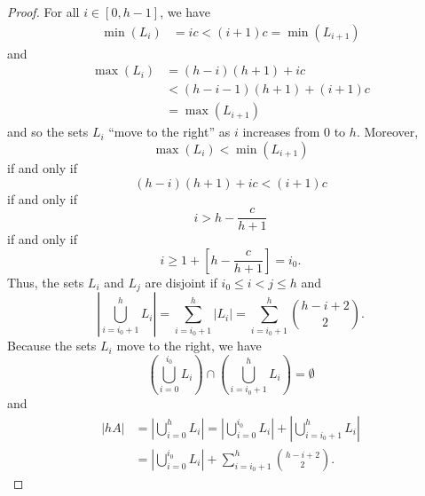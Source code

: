\documentclass{amsart}
\begin{document}
\begin{proof}
For all $i \in [0,h-1]$, we have 
\begin{align*} 
\min\left(L_i\right)  & =  ic  <  (i+1)c  = \min\left( L_{i+1} \right)  
\end{align*} 
and 
\begin{align*} 
\max\left(L_i \right) & = (h-i)(h+1) + ic  \\
& < (h-i-1)(h+1) + (i+1)c \\
& = \max\left( L_{i+1} \right)  
\end{align*} 
and so the sets $L_i$ ``move to  the right'' as $i$ increases 
from 0 to $h$. 
Moreover, 
\[
\max\left( L_i \right) <  \min\left(L_{i+1} \right)  
\]
if and only if 
\[
 (h-i)(h+1)  + ic <  (i+1)c
\]
if and only if 
\[
i > h - \frac{c}{h+1} 
\]
if and only if 
\[
i \geq 1 + \left[  h - \frac{c}{h+1} \right] = i_0.  
\]
Thus, the sets $ L_i$ and $L_j$ are disjoint if $i_0 \leq i < j \leq h$ 
and 
\[
\left| \bigcup_{i=i_0+1}^h L_i \right| = \sum_{i=i_0+1}^h  \left|  L_i \right| 
= \sum_{i=i_0+1}^h  \binom{h-i+2}{2}. 
\]
Because the sets $L_i$ move to the right, we have 
\[
\left( \bigcup_{i=0}^{i_0} L_i  \right) \cap \left( \bigcup_{i=i_0+1}^h L_i \right) = \emptyset    
\] 
and 
\begin{align}                   \label{h-adic:PartialSum}
|hA| & = \left| \bigcup_{i=0}^h L_i \right| 
= \left|  \bigcup_{i=0}^{i_0} L_i \right| + \left|  \bigcup_{i=i_0+1}^{h} L_i \right|  
\nonumber  \\
& = \left|  \bigcup_{i=0}^{i_0} L_i \right| +  \sum_{i=i_0+1}^h  \binom{h-i+2}{2}. \end{align}




\end{proof}
\end{document}
